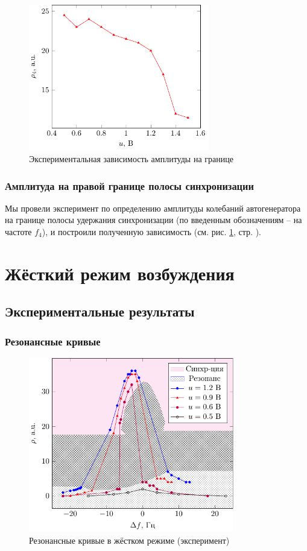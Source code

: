 \documentclass[a4paper,14pt]{extarticle}
\begin{document}
\begin{figure}[H]
	\centering
	\includegraphics[width=0.7\textwidth]{plot/ampl.pdf}
	\vspace{-1em}
	\caption{Экспериментальная зависимость амплитуды на границе}
	\label{fig:ampl}
\end{figure}
\subsubsection{Амплитуда на правой границе полосы синхронизации}
Мы провели эксперимент по определению амплитуды колебаний автогенератора на границе полосы удержания синхронизации (по введенным обозначениям -- на частоте $f_4$), и построили полученную зависимость (см. рис. \ref{fig:ampl}, стр. \pageref{fig:ampl}).

\section{Жёсткий режим возбуждения}
\subsection{Экспериментальные результаты}
\subsubsection{Резонансные кривые}
\begin{figure}[H]
	\centering
	\includegraphics[width=0.8\textwidth]{plot/hard.pdf}
	\vspace{-1em}
	\caption{Резонансные кривые в жёстком режиме (эксперимент)}
	\label{fig:hard}
\end{figure}
\end{document}
